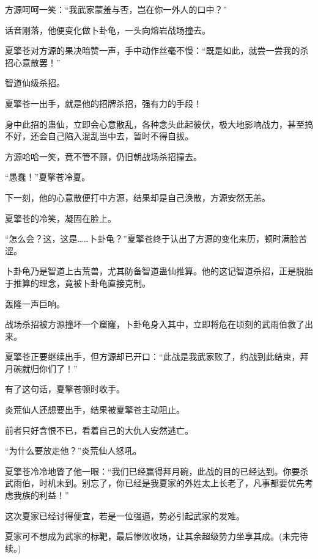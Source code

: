 \begin{this_body}
方源呵呵一笑：“我武家蒙羞与否，岂在你一外人的口中？”

话音刚落，他便变化做卜卦龟，一头向熔岩战场撞去。

夏擎苍对方源的果决暗赞一声，手中动作丝毫不慢：“既是如此，就尝一尝我的杀招心意散罢！”

智道仙级杀招。

夏擎苍一出手，就是他的招牌杀招，强有力的手段！

身中此招的蛊仙，立即会心意散乱，各种念头此起彼伏，极大地影响战力，甚至搞不好，还会自己陷入混乱当中去，暂时不得自拔。

方源哈哈一笑，竟不管不顾，仍旧朝战场杀招撞去。

“愚蠢！”夏擎苍冷夏。

下一刻，他的心意散便打中方源，结果却是自己涣散，方源安然无恙。

夏擎苍的冷笑，凝固在脸上。

“怎么会？这，这是……卜卦龟？”夏擎苍终于认出了方源的变化来历，顿时满脸苦涩。

卜卦龟乃是智道上古荒兽，尤其防备智道蛊仙推算。他的这记智道杀招，正是脱胎于推算的理念，竟被卜卦龟直接克制。

轰隆一声巨响。

战场杀招被方源撞坏一个窟窿，卜卦龟身入其中，立即将危在顷刻的武雨伯救了出来。

夏擎苍正要继续出手，但方源却已开口：“此战是我武家败了，约战到此结束，拜月碗就归你们了！”

有了这句话，夏擎苍顿时收手。

炎荒仙人还想要出手，结果被夏擎苍主动阻止。

前者只好含恨不已，看着自己的大仇人安然逃亡。

“为什么要放走他？”炎荒仙人怒吼。

夏擎苍冷冷地瞥了他一眼：“我们已经赢得拜月碗，此战的目的已经达到。你要杀武雨伯，时机未到。别忘了，你已经是我夏家的外姓太上长老了，凡事都要优先考虑我族的利益！”

这次夏家已经讨得便宜，若是一位强逼，势必引起武家的发难。

夏家可不想成为武家的标靶，最后惨败收场，让其余超级势力坐享其成。(未完待续。)

\end{this_body}


